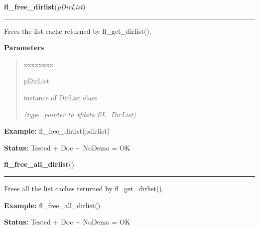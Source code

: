\hspace{.8\funcindent}\begin{boxedminipage}{\funcwidth}

    \raggedright \textbf{fl\_free\_dirlist}(\textit{pDirList})

    \vspace{-1.5ex}

    \rule{\textwidth}{0.5\fboxrule}
\setlength{\parskip}{2ex}
    Frees the list cache returned by fl\_get\_dirlist().

\setlength{\parskip}{1ex}
      \textbf{Parameters}
      \vspace{-1ex}

      \begin{quote}
        \begin{Ventry}{xxxxxxxx}

          \item[pDirList]

          instance of DirList class

            {\it (type=pointer to xfdata.FL\_DirList)}

        \end{Ventry}

      \end{quote}

\textbf{Example:} fl\_free\_dirlist(pdirlist)



\textbf{Status:} Tested + Doc + NoDemo = OK



    \end{boxedminipage}

    \label{xformslib:flfilesys:fl_free_all_dirlist}

    \vspace{0.5ex}

\hspace{.8\funcindent}\begin{boxedminipage}{\funcwidth}

    \raggedright \textbf{fl\_free\_all\_dirlist}()

    \vspace{-1.5ex}

    \rule{\textwidth}{0.5\fboxrule}
\setlength{\parskip}{2ex}
    Frees all the list caches returned by fl\_get\_dirlist().

\setlength{\parskip}{1ex}
\textbf{Example:} fl\_free\_all\_dirlist()



\textbf{Status:} Tested + Doc + NoDemo = OK



    \end{boxedminipage}

